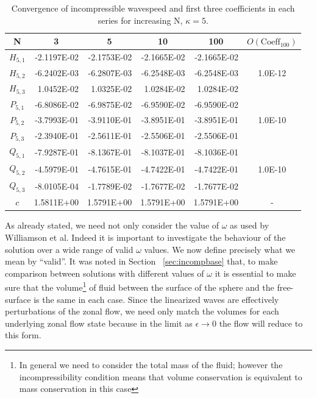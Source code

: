 \begin{table}[htbp]
	\centering
		\begin{tabular}{|c|r|r|r|r|c|} \hline
		N&\multicolumn{1}{|c|}{3}&\multicolumn{1}{|c|}{5}&\multicolumn{1}{|c|}{10}&
		\multicolumn{1}{|c|}{100}&$O(\text{Coeff}_{100})$ \\
		\hline
		$H_{5,1}$ &-2.1197E-02& -2.1753E-02&-2.1665E-02&-2.1665E-02&\\
		$H_{5,2}$ &-6.2402E-03&-6.2807E-03&-6.2548E-03&-6.2548E-03&1.0E-12 \\
		$H_{5,3}$ &1.0452E-02&1.0325E-02&1.0284E-02&1.0284E-02& \\ \hline
		$P_{5,1}$ &-6.8086E-02&-6.9875E-02&-6.9590E-02&-6.9590E-02& \\
		$P_{5,2}$ &-3.7993E-01&-3.9110E-01&-3.8951E-01&-3.8951E-01&1.0E-10\\
		$P_{5,3}$ &-2.3940E-01&-2.5611E-01&-2.5506E-01&-2.5506E-01& \\ \hline
		$Q_{5,1}$ &-7.9287E-01&-8.1367E-01&-8.1037E-01&-8.1036E-01& \\
		$Q_{5,2}$ &-4.5979E-01&-4.7615E-01&-4.7422E-01&-4.7422E-01&1.0E-10\\
		$Q_{5,3}$ &-8.0105E-04&-1.7789E-02&-1.7677E-02&-1.7677E-02& \\ \hline
		$c$ &1.5811E+00&1.5791E+00&1.5791E+00&1.5791E+00&- \\
		\hline			
		\end{tabular}
	\caption{Convergence of incompressible wavespeed and first three coefficients in each series for increasing N, $\kappa=5$.}
	\label{tab:incompconverg5}
\end{table}

As already stated, we need not only consider the value of $\omega$ as used by Williamson et al. Indeed it is important to investigate the behaviour of the solution over a wide range of valid $\omega$ values. We now define precisely what we mean by ``valid''. It was noted in Section~ \ref{sec:incompbase} that, to make comparison between solutions with different values of $\omega$ it is essential to make sure that the volume\footnote{In general we need to consider the total mass of the fluid; however the incompressibility condition means that volume conservation is equivalent to mass conservation in this case} of fluid between the surface of the sphere and the free-surface is the same in each case. Since the linearized waves are effectively perturbations of the zonal flow, we need only match the volumes for each underlying zonal flow state because in the limit as $\epsilon\to0$ the flow will reduce to this form.

